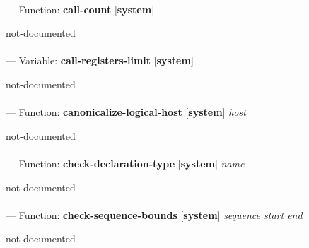 \paragraph{}
\label{SYSTEM:CALL-COUNT}
--- Function: \textbf{call-count} [\textbf{system}] \textit{}

\begin{adjustwidth}{5em}{5em}
not-documented
\end{adjustwidth}

\paragraph{}
\label{SYSTEM:CALL-REGISTERS-LIMIT}
--- Variable: \textbf{call-registers-limit} [\textbf{system}] \textit{}

\begin{adjustwidth}{5em}{5em}
not-documented
\end{adjustwidth}

\paragraph{}
\label{SYSTEM:CANONICALIZE-LOGICAL-HOST}
--- Function: \textbf{canonicalize-logical-host} [\textbf{system}] \textit{host}

\begin{adjustwidth}{5em}{5em}
not-documented
\end{adjustwidth}

\paragraph{}
\label{SYSTEM:CHECK-DECLARATION-TYPE}
--- Function: \textbf{check-declaration-type} [\textbf{system}] \textit{name}

\begin{adjustwidth}{5em}{5em}
not-documented
\end{adjustwidth}

\paragraph{}
\label{SYSTEM:CHECK-SEQUENCE-BOUNDS}
--- Function: \textbf{check-sequence-bounds} [\textbf{system}] \textit{sequence start end}

\begin{adjustwidth}{5em}{5em}
not-documented
\end{adjustwidth}

